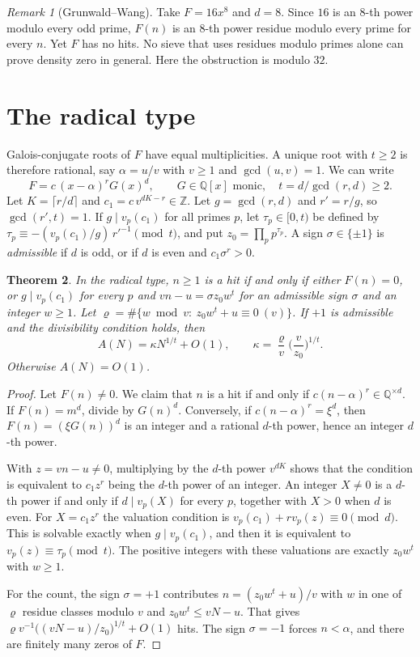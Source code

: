 \documentclass[11pt]{amsart}
\newtheorem{theorem}{Theorem}[section]
\theoremstyle{definition}
\theoremstyle{remark}
\newtheorem{remark}[theorem]{Remark}
\newcommand{\Z}{\mathbb{Z}}
\newcommand{\Q}{\mathbb{Q}}
\begin{document}
\begin{remark}[Grunwald--Wang]
Take $F=16x^8$ and $d=8$. Since $16$ is an $8$-th power modulo every odd prime, $F(n)$ is an $8$-th power residue modulo every prime for every $n$. Yet $F$ has no hits. No sieve that uses residues modulo primes alone can prove density zero in general. Here the obstruction is modulo $32$.
\end{remark}

\section{The radical type}\label{sec:radical}

Galois-conjugate roots of $F$ have equal multiplicities. A unique root with $t\ge2$ is therefore rational, say $\alpha=u/v$ with $v\ge1$ and $\gcd(u,v)=1$. We can write
\[
F=c\,(x-\alpha)^rG(x)^d,\qquad G\in\Q[x]\text{ monic},\quad t=d/\gcd(r,d)\ge2 .
\]
Let $K=\lceil r/d\rceil$ and $c_1=c\,v^{dK-r}\in\Z$. Let $g=\gcd(r,d)$ and $r'=r/g$, so $\gcd(r',t)=1$. If $g\mid v_p(c_1)$ for all primes $p$, let $\tau_p\in[0,t)$ be defined by $\tau_p\equiv-(v_p(c_1)/g)\,r'^{-1}\pmod t$, and put $z_0=\prod_p p^{\tau_p}$. A sign $\sigma\in\{\pm1\}$ is \emph{admissible} if $d$ is odd, or if $d$ is even and $c_1\sigma^r>0$.

\begin{theorem}\label{thm:radical}
In the radical type, $n\ge1$ is a hit if and only if either $F(n)=0$, or $g\mid v_p(c_1)$ for every $p$ and $vn-u=\sigma z_0w^t$ for an admissible sign $\sigma$ and an integer $w\ge1$. Let $\varrho=\#\{w\bmod v:\ z_0w^t+u\equiv0\ (v)\}$. If $+1$ is admissible and the divisibility condition holds, then
\begin{equation}\label{eq:kappaB}
A(N)=\kappa N^{1/t}+O(1),\qquad \kappa=\frac{\varrho}{v}\Big(\frac{v}{z_0}\Big)^{1/t}.
\end{equation}
Otherwise $A(N)=O(1)$.
\end{theorem}

\begin{proof}
Let $F(n)\ne0$. We claim that $n$ is a hit if and only if $c(n-\alpha)^r\in\Q^{\times d}$. If $F(n)=m^d$, divide by $G(n)^d$. Conversely, if $c(n-\alpha)^r=\xi^d$, then $F(n)=(\xi G(n))^d$ is an integer and a rational $d$-th power, hence an integer $d$-th power.

With $z=vn-u\ne0$, multiplying by the $d$-th power $v^{dK}$ shows that the condition is equivalent to $c_1z^r$ being the $d$-th power of an integer. An integer $X\ne0$ is a $d$-th power if and only if $d\mid v_p(X)$ for every $p$, together with $X>0$ when $d$ is even. For $X=c_1z^r$ the valuation condition is $v_p(c_1)+rv_p(z)\equiv0\pmod d$. This is solvable exactly when $g\mid v_p(c_1)$, and then it is equivalent to $v_p(z)\equiv\tau_p\pmod t$. The positive integers with these valuations are exactly $z_0w^t$ with $w\ge1$.

For the count, the sign $\sigma=+1$ contributes $n=(z_0w^t+u)/v$ with $w$ in one of $\varrho$ residue classes modulo $v$ and $z_0w^t\le vN-u$. That gives $\varrho v^{-1}\big((vN-u)/z_0\big)^{1/t}+O(1)$ hits. The sign $\sigma=-1$ forces $n<\alpha$, and there are finitely many zeros of $F$.
\end{proof}
\end{document}
